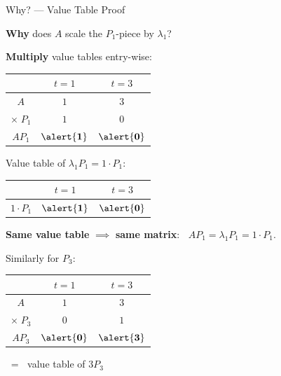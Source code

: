 \documentclass[10pt]{beamer}
\theoremstyle{definition}
\newcommand{\x}[1]{\alert{\textbf{#1}}}
\begin{document}
%
%
\begin{frame}[shrink=15]{Why? --- Value Table Proof}

\x{Why} does $A$ scale the $P_1$-piece by $\lambda_1$?

\vfill

\x{Multiply} value tables entry-wise:

\begin{center}
\renewcommand{\arraystretch}{1.3}
\begin{tabular}{c|cc}
 & $t = 1$ & $t = 3$ \\
\hline
$A$ & $1$ & $3$ \\
$\times\; P_1$ & $1$ & $0$ \\
\hline
$AP_1$ & $\x{1}$ & $\x{0}$
\end{tabular}
\end{center}

\vfill\pause

Value table of $\lambda_1 P_1 = 1 \cdot P_1$:

\begin{center}
\renewcommand{\arraystretch}{1.3}
\begin{tabular}{c|cc}
 & $t = 1$ & $t = 3$ \\
\hline
$1 \cdot P_1$ & $\x{1}$ & $\x{0}$
\end{tabular}
\end{center}

\x{Same value table} $\implies$ \x{same matrix}: $\;\; AP_1 = \lambda_1 P_1 = 1 \cdot P_1$.

\vfill\pause

Similarly for $P_3$:

\begin{center}
\renewcommand{\arraystretch}{1.3}
\begin{tabular}{c|cc}
 & $t = 1$ & $t = 3$ \\
\hline
$A$ & $1$ & $3$ \\
$\times\; P_3$ & $0$ & $1$ \\
\hline
$AP_3$ & $\x{0}$ & $\x{3}$
\end{tabular}
$\;=\;$ value table of $3 P_3$ \;\checkmark
\end{center}

\end{frame}
\end{document}
